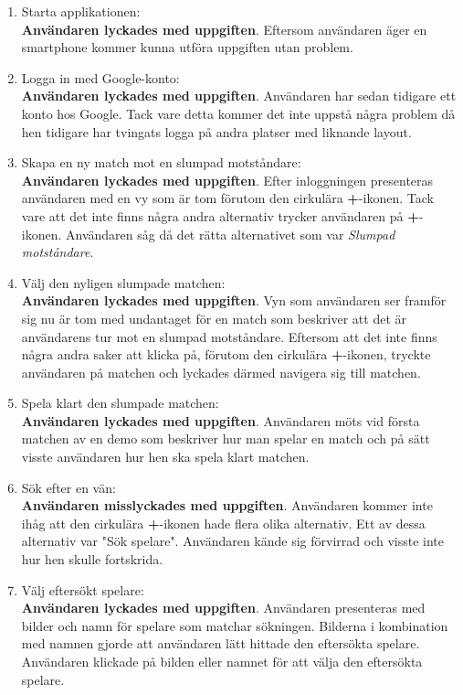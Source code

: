 \documentclass[a4paper, 11pt]{article}
\begin{document}
\begin{enumerate}
\item Starta applikationen:\\
\textbf{Användaren lyckades med uppgiften}. Eftersom användaren äger en smartphone kommer kunna utföra uppgiften utan problem.

\item Logga in med Google-konto:\\ 
\textbf{Användaren lyckades med uppgiften}. Användaren har sedan tidigare ett konto hos Google. Tack vare detta kommer det inte uppstå några problem då hen tidigare har tvingats logga på andra platser med liknande layout.

\item Skapa en ny match mot en slumpad motståndare:\\
\textbf{Användaren lyckades med uppgiften}. Efter inloggningen presenteras användaren med en vy som är tom förutom den cirkulära \textbf{+}-ikonen. Tack vare att det inte finns några andra alternativ trycker användaren på \textbf{+}-ikonen. Användaren såg då det rätta alternativet som var \textit{Slumpad motståndare}.

\item Välj den nyligen slumpade matchen:\\
\textbf{Användaren lyckades med uppgiften}. Vyn som användaren ser framför sig nu är tom med undantaget för en match som beskriver att det är användarens tur mot en slumpad motståndare. Eftersom att det inte finns några andra saker att klicka på, förutom den cirkulära \textbf{+}-ikonen, tryckte användaren på matchen och lyckades därmed navigera sig till matchen.

\item Spela klart den slumpade matchen:\\
\textbf{Användaren lyckades med uppgiften}. Användaren möts vid första matchen av en demo som beskriver hur man spelar en match och på sätt visste användaren hur hen ska spela klart matchen.

\item Sök efter en vän:\\ 
\textbf{Användaren misslyckades med uppgiften}. Användaren kommer inte ihåg att den cirkulära \textbf{+}-ikonen hade flera olika alternativ. Ett av dessa alternativ var "Sök spelare". Användaren kände sig förvirrad och visste inte hur hen skulle fortskrida.

\item Välj eftersökt spelare:\\ 
\textbf{Användaren lyckades med uppgiften}. Användaren presenteras med bilder och namn för spelare som matchar sökningen. Bilderna i kombination med namnen gjorde att användaren lätt hittade den eftersökta spelare. Användaren klickade på bilden eller namnet för att välja den eftersökta spelare.


\end{enumerate}
\end{document}
